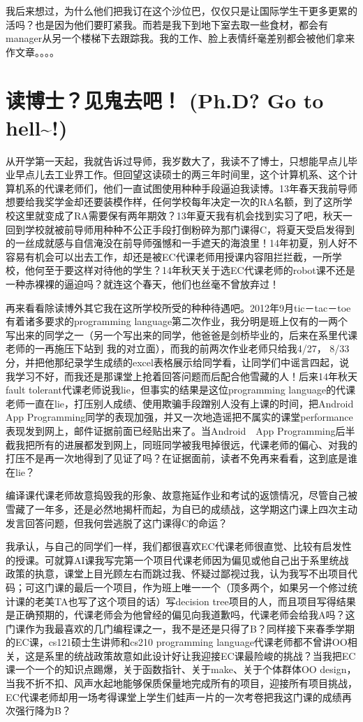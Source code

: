 \documentclass[12pt]{book}
\begin{document}
我后来想过，为什么他们把我订在这个沙位巴，仅仅只是让国际学生干更多更累的活吗？也是因为他们要盯紧我。而若是我下到地下室去取一些食材，都会有manager从另一个楼梯下去跟踪我。我的工作、脸上表情纤毫差别都会被他们拿来作文章。。。。　

\chapter{读博士？见鬼去吧！ (Ph.D? Go to hell\textasciitilde{}!)}
\label{sec-42}
从开学第一天起，我就告诉过导师，我岁数大了，我读不了博士，只想能早点儿毕业早点儿去工业界工作。但回望这读硕士的两三年时间里，这个计算机系、这个计算机系的代课老师们，他们一直试图使用种种手段逼迫我读博。13年春天我前导师想要给我奖学金却还要装模作样，任何学校每年决定一次的RA名额，到了这所学校这里就变成了RA需要保有两年期效？13年夏天我有机会找到实习了吧，秋天一回到学校就被前导师用种种不公正手段打倒粉碎为那门课得C，将夏天受启发得到的一丝成就感与自信淹没在前导师强憾和一手遮天的海浪里！14年初夏，别人好不容易有机会可以出去工作，却还是被EC代课老师用授课内容阻拦拦截，一所学校，他何至于要这样对待他的学生？14年秋天关于选EC代课老师的robot课不还是一种赤裸裸的逼迫吗？就连这个春天，他们也丝毫不曾放弃过！

再来看看除读博外其它我在这所学校所受的种种待遇吧。2012年9月tic－tac－toe有着诸多要求的programming language第二次作业，我分明是班上仅有的一两个写出来的同学之一（另一个写出来的同学，他爸爸是剑桥毕业的，后来在系里代课老师的一再施压下站到 我的对立面），而我的前两次作业老师只给我4/27， 8/33分，并把他那纪录学生成绩的excel表格展示给同学看，让同学们中谣言四起，说我学习不好，而我还是那课堂上抢着回答问题而后配合他雪藏的人！后来14年秋天fault tolerant代课老师说我lie，但事实的结果是这位programming language的代课老师一直在lie，打压别人成绩、使用欺骗手段蹭别人没有上课的时间，把Android　App Programming同学的表现加强，并又一次地造谣把不属实的课堂performance表现发到网上，邮件证据前面已经贴出来了。当Android　App Programming后半截我把所有的进展都发到网上，同班同学被我甩掉很远，代课老师的偏心、对我的打压不是再一次地得到了见证了吗？在证据面前，读者不免再来看看，这到底是谁在lie？

编译课代课老师故意捣毁我的形象、故意拖延作业和考试的返馈情况，尽管自己被雪藏了一年多，还是必然地揭杆而起，为自已的成绩战，这学期这门课上四次主动发言回答问题，但我何尝逃脱了这门课得C的命运？

我承认，与自己的同学们一样，我们都很喜欢EC代课老师很直觉、比较有启发性的授课。可就算AI课我写完第一个项目代课老师因为偏见或他自己出于系里统战政策的执意，课堂上目光顾左右而跳过我、怀疑过鄙视过我，认为我写不出项目代码；可这门课的最后一个项目，作为班上唯一一个（顶多两个，如果另一个修过统计课的老美TA也写了这个项目的话）写decision tree项目的人，而且项目写得结果是正确预期的，代课老师会为他曾经的偏见向我道歉吗，代课老师会给我A吗？这门课作为我最喜欢的几门编程课之一，我不是还是只得了B？同样接下来春季学期的EC课，cs121硕士生讲师和cs210 programming language代课老师都不曾讲OO相关，这是系里的统战政策故意如此设计好让我迎接EC课最险峻的挑战？当我把EC课一个一个的知识点踢爆，关于函数指针、关于make、关于个体群体OO design，当我不折不扣、风声水起地能够保质保量地完成所有的项目，迎接所有项目挑战，EC代课老师却用一场考得课堂上学生们蛙声一片的一次考卷把我这门课的成绩再次强行降为B？
\end{document}
